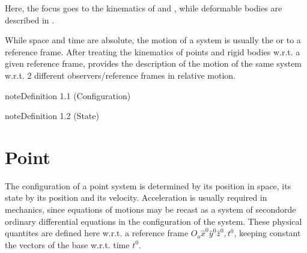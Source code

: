\documentclass[letterpaper,10pt,english]{jupyterBook}
\begin{document}
\sphinxAtStartPar
Here, the focus goes to the kinematics of {\hyperref[\detokenize{ch/kinematics-point:classical-mechanics-kinematics-point}]{}} and {\hyperref[\detokenize{ch/kinematics-rigid:classical-mechanics-kinematics-rigid-body}]{}}, while deformable bodies are described in  \sphinxhyphen{} .

\sphinxAtStartPar
While space and time are absolute, the motion of a system is usually the  or to a reference frame. After treating the kinematics of points and rigid bodies w.r.t. a given reference frame, {\hyperref[\detokenize{ch/kinematics-relative:classical-mechanics-kinematics-relative}]{}} provides the description of the motion of the same system w.r.t. 2 different observers/reference frames in relative motion.
\label{ch/kinematics:definition-0}
\begin{sphinxadmonition}{note}{Definition 1.1 (Configuration)}


\end{sphinxadmonition}
\label{ch/kinematics:definition-1}
\begin{sphinxadmonition}{note}{Definition 1.2 (State)}


\end{sphinxadmonition}

\sphinxstepscope


\section{Point}
\label{\detokenize{ch/kinematics-point:point}}\label{\detokenize{ch/kinematics-point:classical-mechanics-kinematics-point}}\label{\detokenize{ch/kinematics-point::doc}}
\sphinxAtStartPar
The configuration of a point system is determined by its position in space, its state by its position and its velocity. Acceleration is usually required in mechanics, since equations of motions may be recast as a system of second\sphinxhyphen{}orde ordinary differential equations in the configuration of the system. These physical quantites are defined here w.r.t. a reference frame \(O_o \hat{x}^0 \hat{y}^0 \hat{z}^0, t^0\), keeping constant the vectors of the base w.r.t. time \(t^0\).
\end{document}
